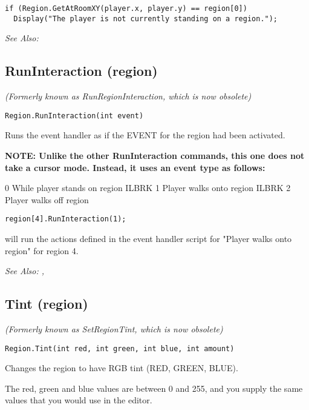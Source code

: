 \begin{verbatim}
if (Region.GetAtRoomXY(player.x, player.y) == region[0])
  Display("The player is not currently standing on a region.");
\end{verbatim}

\it{See Also:} 


\subsection{RunInteraction (region)}\label{Region.RunInteraction}%

\it{(Formerly known as RunRegionInteraction, which is now obsolete)}

\begin{verbatim}
Region.RunInteraction(int event)
\end{verbatim}
Runs the event handler as if the EVENT for the region had been activated.

\bf{NOTE:} Unlike the other RunInteraction commands, this one does not take a cursor mode.
Instead, it uses an event type as follows:

0  While player stands on region ILBRK
1  Player walks onto region ILBRK
2  Player walks off region

\begin{verbatim}
region[4].RunInteraction(1);
\end{verbatim}
will run the actions defined in the event handler script for "Player walks onto region"
for region 4.

\it{See Also:} ,


\subsection{Tint (region)}\label{Region.Tint}%

\it{(Formerly known as SetRegionTint, which is now obsolete)}

\begin{verbatim}
Region.Tint(int red, int green, int blue, int amount)
\end{verbatim}
Changes the region to have RGB tint (RED, GREEN, BLUE).

The red, green and blue values are between 0 and 255, and you supply the same
values that you would use in the editor.

